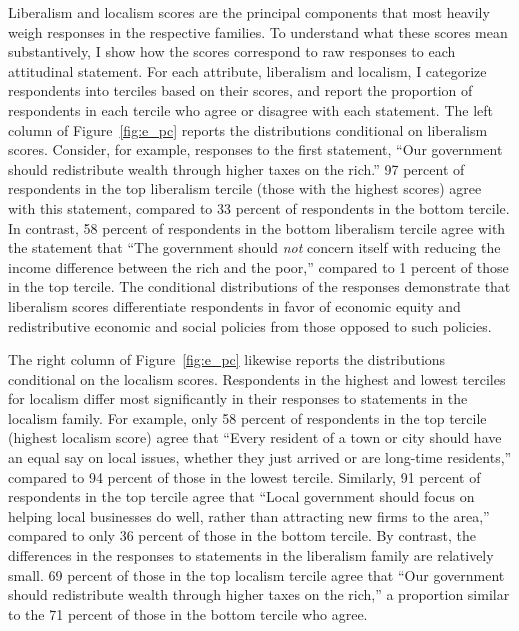 \documentclass[article,11pt]{memoir}
\begin{document}
Liberalism and localism scores are the principal components that most heavily weigh responses in the respective families.  To understand what these scores mean substantively, I show how the scores correspond to raw responses to each attitudinal statement. For each attribute, liberalism and localism, I categorize respondents into  terciles based on their scores, and report the proportion of respondents in each tercile who agree or disagree with each statement.  The left column of Figure~\ref{fig:e_pc} reports the distributions conditional on liberalism scores.  Consider, for example, responses to the first statement, ``Our government should redistribute wealth through higher taxes on the rich.''  97 percent of respondents in the top liberalism tercile (those with the highest scores) agree with this statement, compared to 33 percent of respondents in the bottom tercile.  In contrast, 58 percent of respondents in the bottom liberalism tercile agree with the statement that ``The government should \emph{not} concern itself with reducing the income difference between the rich and the poor,'' compared to 1 percent of those in the top tercile. The conditional distributions of the responses demonstrate that liberalism scores differentiate respondents in favor of economic equity and redistributive economic and social policies from those opposed to such policies.

The right column of Figure~\ref{fig:e_pc} likewise reports the distributions conditional on the localism scores.  Respondents in the highest and lowest terciles for localism differ most significantly in their responses to statements in the localism family. For example, only 58 percent of respondents in the top tercile (highest localism score) agree that ``Every resident of a town or city should have an equal say on local issues, whether they just arrived or are long-time residents,'' compared to 94 percent of those in the lowest tercile.  Similarly, 91 percent of respondents in the top tercile agree that ``Local government should focus on helping local businesses do well, rather than attracting new firms to the area,'' compared to only 36 percent of those in the bottom tercile.  By contrast, the differences in the responses to statements in the liberalism family are relatively small.  69 percent of those in the top localism tercile agree that ``Our government should redistribute wealth through higher taxes on the rich,'' a proportion similar to the 71 percent of those in the bottom tercile who agree.

\end{document}
